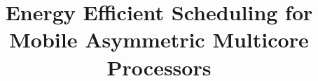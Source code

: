 \documentclass[conference]{IEEEtran}
\begin{document}
\title{Energy Efficient Scheduling for Mobile Asymmetric Multicore Processors}



\maketitle
\end{document}
